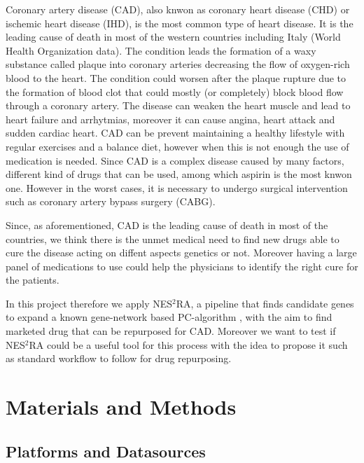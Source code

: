 \documentclass[fleqn,10pt]{SelfArx} %
\begin{document}
Coronary artery disease (CAD), also knwon as coronary heart disease (CHD) or ischemic heart disease (IHD), is the most common type of heart disease. It is the leading cause of death in most of the western countries including Italy (World Health Organization data). The condition leads the formation of a waxy substance called plaque into coronary arteries decreasing the flow of oxygen-rich blood to the heart. The condition could worsen after the plaque rupture due to the formation of blood clot that could mostly (or completely) block blood flow through a coronary artery. The disease can weaken the heart muscle and lead to heart failure and arrhytmias, moreover it can cause angina, heart attack and sudden cardiac heart.
CAD can be prevent maintaining a healthy lifestyle with regular exercises and a balance diet, however when this is not enough the use of medication is needed. Since CAD is a complex disease caused by many factors, different kind of drugs that can be used, among which aspirin is the most knwon one. 
However in the worst cases, it is necessary to undergo surgical intervention such as coronary artery bypass surgery (CABG).

Since, as aforementioned, CAD is the leading cause of death in most of the countries, we think there is the unmet medical need to find new drugs able to cure the disease acting on diffent aspects genetics or not. Moreover having a large panel of medications to use could help the physicians to identify the right cure for the patients.

In this project therefore we apply NES$^2$RA\cite{NES2RA}, a pipeline that finds candidate genes to expand a known gene-network based PC-algorithm \cite{PC-alg}, with the aim to find marketed drug that can be repurposed for CAD.
Moreover we want to test if NES$^2$RA could be a useful tool for this process with the idea to propose it such as standard workflow to follow for drug repurposing. 

\section*{Materials and Methods}

\subsection*{Platforms and Datasources}
\end{document}
